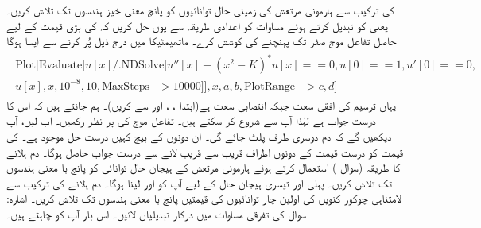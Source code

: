  کی ترکیب سے ہارمونی مرتعش کی زمینی حال توانائیوں کو پانچ معنی خیز ہندسوں تک تلاش کریں۔ یعنی  کو تبدیل کرتے ہوئے مساوات  کو اعدادی طریقہ سے یوں حل کریں کہ  کی بڑی قیمت کے لیے حاصل تفاعل موج صفر تک پہنچنے کی کوشش کرے۔ ماتھیمٹیکا میں درج ذیل پُر کرنے سے ایسا ہوگا
\begin{gather*}
\begin{aligned}
	\text{Plot}[\text{Evaluate}[u[x]/.\text{NDSolve}[{u''[x]-(x^2-K)^*u[x]==0, u[0]==1, u'[0]==0},\\
	u[x],{x, 10^{-8}, 10}, \text{MaxSteps}->\num{10000}]], {x, a, b}, \text{PlotRange}->{c, d}]
\end{aligned}
\end{gather*}
یہاں  ترسیم کی افقی سعت جبکہ  انتصابی سعت ہے(ابتدا ، ، اور  سے کریں)۔ ہم جانتے ہیں کہ اس کا درست جواب  ہے لہٰذا آپ  سے شروع کر سکتے ہیں۔ تفاعل موج کی  پر نظر رکھیں۔ اب  لیں، آپ دیکھیں گے کہ دم دوسری طرف پلٹ جائے گی۔ ان دونوں کے بیچ کہیں درست حل موجود ہے۔  کی قیمت کو درست قیمت کے دونوں اطراف قریب سے قریب لانے سے درست جواب حاصل ہوگا۔
دم ہلانے کا طریقہ (سوال ) استعمال کرتے ہوئے ہارمونی مرتعش کے ہیجان حال توانائی کو پانچ با معنی ہندسوں تک تلاش کریں۔ پہلی اور تیسری ہیجان حال کے لیے آپ کو  اور  لینا ہوگا۔
دم ہلانے کی ترکیب سے لامتناہی چوکور کنویں کی اولین چار توانائیوں کی قیمتیں پانچ با معنی ہندسوں تک تلاش کریں۔ اشارہ: سوال  کی تفرقی مساوات میں درکار تبدیلیاں لائیں۔ اس بار آپ کو چاہتے ہیں۔

